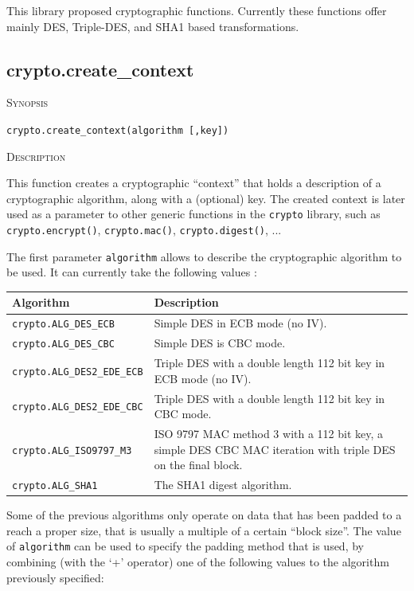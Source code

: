 \documentclass[11pt]{report}
\newcommand{\mansection}[1]{\vspace{0.5em}\par\noindent\textsc{#1}\vspace{0.5em}\par}
\newcommand{\syn}[1]{\texttt{#1}}
\begin{document}
This library proposed cryptographic functions.
Currently these functions offer mainly DES, Triple-DES, and SHA1 based transformations.

\subsection{crypto.create\_context}

\mansection{Synopsis}
\syn{crypto.create\_context(algorithm [,key])}

\mansection{Description}
  This function creates a cryptographic ``context'' that holds a description of a 
  cryptographic algorithm, along with a (optional) key.
  The created context is later used as a parameter to other generic functions in the \syn{crypto}
  library, such as \syn{crypto.encrypt()}, \syn{crypto.mac()}, \syn{crypto.digest()}, ...

  The first parameter \syn{algorithm} allows to describe the cryptographic algorithm to be used.
  It can currently take the following values :

  \vspace{2em}
  \begin{tabular}{|l|p{8cm}|}
  \hline
  \textbf{Algorithm}                & \textbf{Description} \\
  \hline
  \hline
  \syn{crypto.ALG\_DES\_ECB}        & Simple DES in ECB mode (no IV). \\
  \hline
  \syn{crypto.ALG\_DES\_CBC}        & Simple DES is CBC mode. \\
  \hline
  \syn{crypto.ALG\_DES2\_EDE\_ECB}  & Triple DES with a double length 112 bit key in ECB mode (no IV). \\
  \hline
  \syn{crypto.ALG\_DES2\_EDE\_CBC}  & Triple DES with a double length 112 bit key in CBC mode.  \\
  \hline
  \syn{crypto.ALG\_ISO9797\_M3}     & ISO 9797 MAC method 3 with a 112 bit key, 
                                      a simple DES CBC MAC iteration with triple DES on the final block.\\
  \hline
  \syn{crypto.ALG\_SHA1}            & The SHA1 digest algorithm. \\
  \hline
  \end{tabular}
  \vspace{2em}

  Some of the previous algorithms only operate on data that has been padded
  to a reach a proper size, that is usually a multiple of a certain ``block size''.
  The value of \syn{algorithm} can be used to specify the padding method that is used, 
  by combining (with the `+' operator) one of the following values to the algorithm 
  previously specified:
\end{document}
